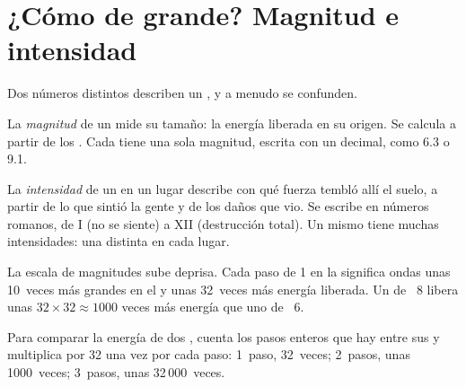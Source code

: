 \section{¿Cómo de grande? Magnitud e intensidad}

Dos números distintos describen un , y a menudo se confunden.

\begin{definition}[Magnitud]\label{def:g7:earthquakes:magnitude}
La \emph{magnitud} de un  mide su tamaño: la
energía liberada en su origen. Se calcula a partir de los .
Cada  tiene una sola magnitud, escrita con un decimal, como 6.3
o 9.1.
\end{definition}

\begin{definition}[Intensidad]\label{def:g7:earthquakes:intensity}
La \emph{intensidad} de un  en un lugar
describe con qué fuerza tembló allí el suelo, a partir de lo que sintió la
gente y de los daños que vio. Se escribe en números romanos, de I (no se
siente) a XII (destrucción total). Un mismo  tiene muchas
intensidades: una distinta en cada lugar.
\end{definition}

La escala de magnitudes sube deprisa. Cada paso de 1 en la 
significa ondas unas 10~veces más grandes en el  y unas 32~veces
más energía liberada. Un  de ~8 libera unas
$32 \times 32 \approx 1000$ veces más energía que uno de ~6.

\begin{method}\label{met:g7:earthquakes:magnitudes}
Para comparar la energía de dos , cuenta los pasos enteros que
hay entre sus  y multiplica por 32 una vez por cada paso:
1~paso, 32~veces; 2~pasos, unas 1000~veces; 3~pasos, unas 32\,000~veces.
\end{method}

